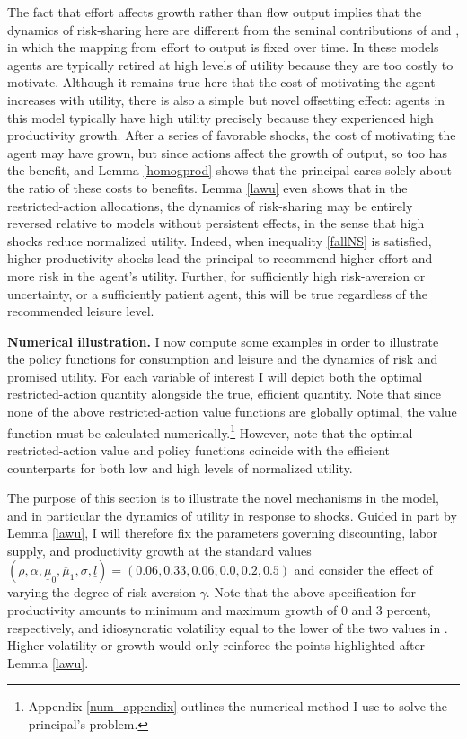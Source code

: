 \documentclass[11pt]{article}
\theoremstyle{plain}
\newcommand{\alphval}{0.33}
\newcommand{\sig}{0.2}
\newcommand{\lbar}{0.5}
\newcommand{\mulow}{0.0}
\newcommand{\muhigh}{0.06}
\newcommand{\rhoval}{0.06}
\begin{document}
The fact that effort affects growth rather than flow output implies that the dynamics of risk-sharing here are different from the seminal contributions of \cite{phelan_computing_1991} and \cite{sannikov_continuous-time_2008}, in which the mapping from effort to output is fixed over time. In these models agents are typically retired at high levels of utility because they are too costly to motivate. Although it remains true here that the cost of motivating the agent increases with utility, there is also a simple but novel offsetting effect: agents in this model typically have high utility precisely because they experienced high productivity growth. After a series of favorable shocks, the cost of motivating the agent may have grown, but since actions affect the growth of output, so too has the benefit, and Lemma \ref{homogprod} shows that the principal cares solely about the ratio of these costs to benefits. Lemma \ref{lawu} even shows that in the restricted-action allocations, the dynamics of risk-sharing may be entirely reversed relative to models without persistent effects, in the sense that high shocks reduce normalized utility. Indeed, when inequality \eqref{fallNS} is satisfied, higher productivity shocks lead the principal to recommend higher effort and more risk in the agent's utility. Further, for sufficiently high risk-aversion or uncertainty, or a sufficiently patient agent, this will be true regardless of the recommended leisure level. 


\textbf{Numerical illustration.} I now compute some examples in order to illustrate the policy functions for consumption and leisure and the dynamics of risk and promised utility. For each variable of interest I will depict both the optimal restricted-action quantity alongside the true, efficient quantity. Note that since none of the above restricted-action value functions are globally optimal, the value function must be calculated numerically.\footnote{Appendix \ref{num_appendix} outlines the numerical method I use to solve the principal's problem.} However, note that the optimal restricted-action value and policy functions coincide with the efficient counterparts for both low and high levels of normalized utility. 


The purpose of this section is to illustrate the novel mechanisms in the model, and in particular the dynamics of utility in response to shocks. Guided in part by Lemma \ref{lawu}, I will therefore fix the parameters governing discounting, labor supply, and productivity growth at the standard values $(\rho, \alpha, \underline{\mu}_0, \overline{\mu}_1, \sigma, \underline{l}) = (\rhoval, \alphval, \muhigh, \mulow, \sig, \lbar)$ and consider the effect of varying the degree of risk-aversion $\gamma$. Note that the above specification for productivity amounts to minimum and maximum growth of 0 and 3 percent, respectively, and idiosyncratic volatility equal to the lower of the two values in \cite{angeletos_uninsured_2007}. Higher volatility or growth would only reinforce the points highlighted after Lemma \ref{lawu}. 
\end{document}
